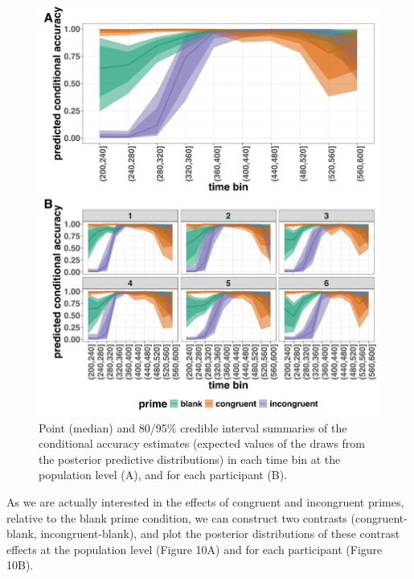 \documentclass[
  man, donotrepeattitle,floatsintext]{apa6}
\begin{document}
\begin{figure}[H]

{\centering \includegraphics[width=0.8\linewidth,height=0.67\textheight,]{../Tutorial_2_Bayesian/figures/M1i_ca_pred_combined} 

}

\caption{Point (median) and 80/95\% credible interval summaries of the conditional accuracy estimates (expected values of the draws from the posterior predictive distributions) in each time bin at the population level (A), and for each participant (B).}\label{fig:plot-pred-grand-effects-ca}
\end{figure}

As we are actually interested in the effects of congruent and incongruent primes, relative to the blank prime condition, we can construct two contrasts (congruent-blank, incongruent-blank), and plot the posterior distributions of these contrast effects at the population level (Figure 10A) and for each participant (Figure 10B).
\end{document}
